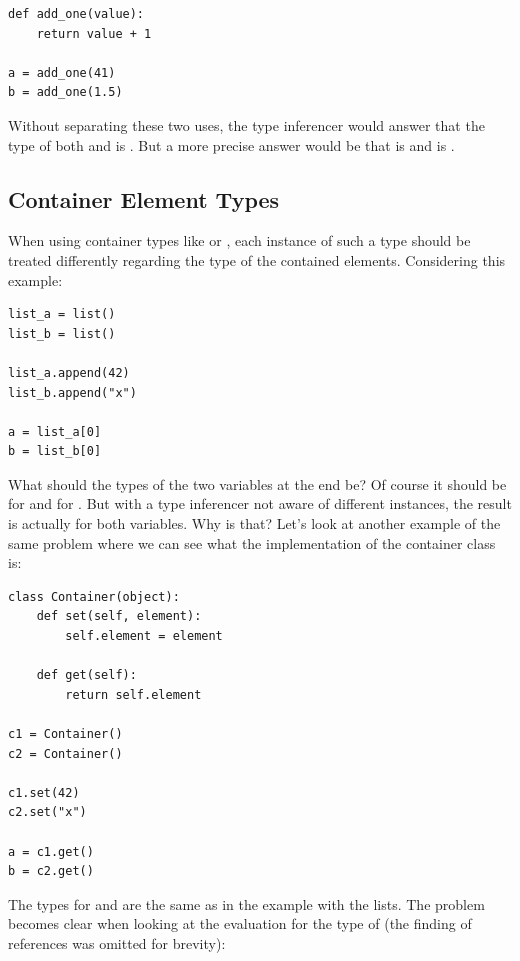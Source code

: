 \documentclass[12pt,halfparskip]{scrreprt}
\begin{document}
\begin{lstlisting}
def add_one(value):
    return value + 1

a = add_one(41)
b = add_one(1.5)
\end{lstlisting}

Without separating these two uses, the type inferencer would answer that the type of both  and  is . But a more precise answer would be that  is  and  is .


\subsection{Container Element Types}

When using container types like  or , each instance of such a type should be treated differently regarding the type of the contained elements. Considering this example:

\begin{lstlisting}
list_a = list()
list_b = list()

list_a.append(42)
list_b.append("x")

a = list_a[0]
b = list_b[0]
\end{lstlisting}

What should the types of the two variables at the end be? Of course it should be  for  and  for . But with a type inferencer not aware of different instances, the result is actually  for both variables. Why is that? Let's look at another example of the same problem where we can see what the implementation of the container class is:

\begin{lstlisting}
class Container(object):
    def set(self, element):
        self.element = element

    def get(self):
        return self.element

c1 = Container()
c2 = Container()

c1.set(42)
c2.set("x")

a = c1.get()
b = c2.get()
\end{lstlisting}

The types for  and  are the same as in the example with the lists. The problem becomes clear when looking at the evaluation for the type of  (the finding of references was omitted for brevity):
\end{document}
